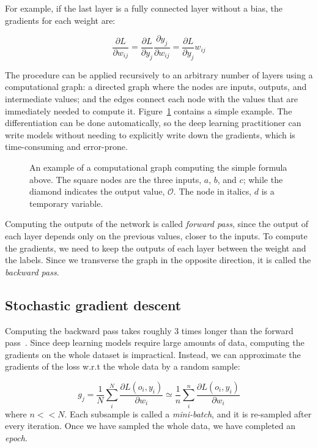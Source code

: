 For example, if the last layer is a fully connected layer without a bias, the gradients for each weight are:

\begin{equation*}
\frac{\partial L}{\partial w_{ij}} = \frac{\partial L}{\partial y_j} \frac{\partial y_j}{\partial w_{ij}} =  \frac{\partial L}{\partial y_j}  w_{ij}
\end{equation*}

The procedure  can be applied recursively to an arbitrary number of layers using a computational graph: a directed graph where the nodes are inputs, outputs, and intermediate values; and the edges connect each node with the values that are immediately needed to compute it.
Figure~\ref{fig:comp_graph} contains a simple example.
The differentiation can be done automatically, so the deep learning practitioner can write models without needing to explicitly write down the gradients, which is time-consuming and error-prone.

\begin{figure}[bht]
	\centering
	\caption{An example of a computational graph computing the simple formula above.
	The square nodes are the three inputs, $a$, $b$, and $c$; while the diamond indicates the output value, $\mathcal{O}$.
    The node in italics, $\mathit{d}$ is a temporary variable.}\label{fig:comp_graph}
\end{figure}


Computing the outputs 
of the network is called \emph{forward pass}, since the output of each layer depends only on the previous values, closer to the inputs.
To compute the gradients, we need to keep the outputs of each layer between the weight and the labels.
Since we transverse the graph in the opposite direction, it is called the \emph{backward pass}.

\subsection{Stochastic gradient descent}\label{sec:sgd}
Computing the backward pass takes roughly 3 times longer than the forward pass~\citep{dl_course}.
Since deep learning models require large amounts of data, computing the gradients on the whole dataset is impractical.
Instead, we can approximate the gradients of the loss w.r.t the whole data by a random sample:

\begin{equation*}
g_j = \frac{1}{N} \sum_i^N \frac{\partial L\left(o_i, y_i\right)}{\partial w_i} \simeq \frac{1}{n} \sum_i^n \frac{\partial L\left(o_i, y_i\right)}{\partial w_i}
\end{equation*}
where $n << N$.
Each subsample is called a \emph{mini-batch}, 
and it is re-sampled after every iteration.
Once we have sampled the whole data, we have completed an \emph{epoch}.

